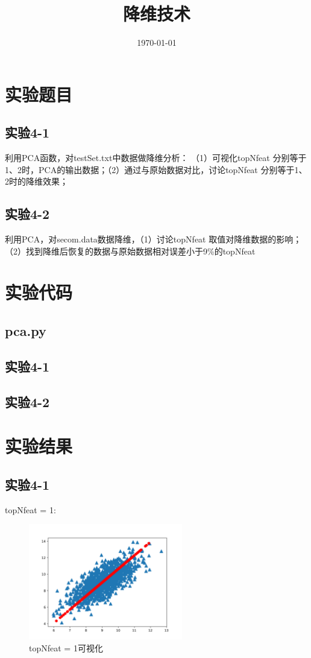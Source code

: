\documentclass{../source/Experiment}
\title{降维技术}
\date{\today}
\begin{document}
\makecover
\section{实验题目}
\subsection{实验4-1}
利用PCA函数，对testSet.txt中数据做降维分析： （1）可视化topNfeat 分别等于1、2时，PCA的输出数据；（2）通过与原始数据对比，讨论topNfeat 分别等于1、2时的降维效果；


\subsection{实验4-2}

利用PCA，对secom.data数据降维，（1）讨论topNfeat 取值对降维数据的影响；（2）找到降维后恢复的数据与原始数据相对误差小于9\%的topNfeat

\section{实验代码}
\subsection{pca.py}

\subsection{实验4-1}

\subsection{实验4-2}


\section{实验结果}
\subsection{实验4-1}
topNfeat = 1:
\begin{figure}[H]
    \centering
    \includegraphics[width = 0.6\textwidth]{Part4/4-1-topNfeat(1).png}
    \caption{topNfeat = 1可视化}
\end{figure}
\end{document}
